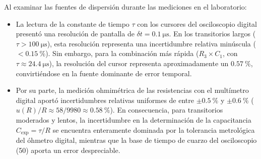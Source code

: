 Al examinar las fuentes de dispersión durante las mediciones en el laboratorio:
\begin{itemize}
    \item La lectura de la constante de tiempo $\tau$ con los cursores del osciloscopio digital presentó una resolución de pantalla de $\delta t = \qty{0,1}{\micro\second}$. En los transitorios largos ($\tau > \qty{100}{\micro\second}$), esta resolución representa una incertidumbre relativa minúscula ($< \qty{0,15}{\percent}$). Sin embargo, para la combinación más rápida ($R_3 \times C_1$, con $\tau \approx \qty{24,4}{\micro\second}$), la resolución del cursor representa aproximadamente un $\qty{0,57}{\percent}$, convirtiéndose en la fuente dominante de error temporal.
    \item Por su parte, la medición ohmimétrica de las resistencias con el multímetro digital aportó incertidumbres relativas uniformes de entre $\pm\qty{0,5}{\percent}$ y $\pm\qty{0,6}{\percent}$ ($u(R)/R \approx 58/9980 \approx \qty{0,58}{\percent}$). En consecuencia, para transitorios moderados y lentos, la incertidumbre en la determinación de la capacitancia $C_{\text{exp}} = \tau / R$ se encuentra enteramente dominada por la tolerancia metrológica del óhmetro digital, mientras que la base de tiempo de cuarzo del osciloscopio (\qty{50}{\ppm}) aporta un error despreciable.
\end{itemize}
